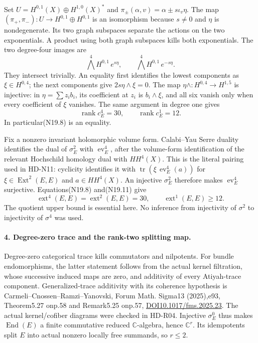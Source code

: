 Set $U=H^{0,1}(X)\oplus H^{1,0}(X)^*$ and
$\pi_\pm(\alpha,v)=\alpha\pm s\iota_v\eta$.
The map $(\pi_+,\pi_-):U\to H^{0,1}\oplus H^{0,1}$ is an
isomorphism because $s\ne0$ and $\eta$ is nondegenerate.
Its two graph subspaces separate the actions on the two
exponentials. A product using both graph subspaces kills both
exponentials. The two degree-four images are
\[
       \bigwedge^4H^{0,1}\,e^{s\eta},\qquad
       \bigwedge^4H^{0,1}\,e^{-s\eta}.                          \tag{N19.10}
\]
They intersect trivially. An equality first identifies the lowest
components as $\xi\in H^{0,4}$; the next components give
$2s\eta\wedge\xi=0$. The map
$\eta\wedge:H^{0,4}\to H^{1,5}$ is injective: in
$\eta=\sum z_i b_i$, its coefficient at $z_i$ is $b_i\wedge\xi$,
and all six vanish only when every coefficient of $\xi$ vanishes.
The same argument in degree one gives
\[
                 \operatorname{rank}c_E^4=30,\qquad
                 \operatorname{rank}c_E^1=12.                 \tag{N19.11}
\]
In particular(N19.8) is an equality.

Fix a nonzero invariant holomorphic volume form. Calabi--Yau Serre
duality identifies the dual of $\sigma_E^2$ with
$\operatorname{ev}_E^4$, after the volume-form identification of the
relevant Hochschild homology dual with $HH^4(X)$. This is the
literal pairing used in HD-N11: cyclicity identifies it with
$\operatorname{tr}(\xi\,\operatorname{ev}_E^4(a))$ for
$\xi\in\operatorname{Ext}^2(E,E)$ and $a\in HH^4(X)$.
An injective $\sigma_E^2$ therefore makes
$\operatorname{ev}_E^4$ surjective. Equations(N19.8) and(N19.11) give
\[
 \operatorname{ext}^4(E,E)=\operatorname{ext}^2(E,E)=30,\qquad
                        \operatorname{ext}^1(E,E)\ge12.        \tag{N19.12}
\]
The quotient upper bound is essential here. No inference from
injectivity of $\sigma^2$ to injectivity of $\sigma^4$ was used.

\paragraph{4. Degree-zero trace and the rank-two splitting map.}
Degree-zero categorical trace kills commutators and nilpotents.
For bundle endomorphisms, the latter statement follows from the
actual kernel filtration, whose successive induced maps are zero,
and additivity of every Atiyah-trace component. Generalized-trace
additivity with its coherence hypothesis is
Carmeli--Cnossen--Ramzi--Yanovski, Forum Math. Sigma13 (2025),e93,
Theorem5.27 onp.58 and Remark5.25 onp.57,
\href{https://doi.org/10.1017/fms.2025.23}{DOI10.1017/fms.2025.23}.
The actual kernel/cofiber diagrams were checked in HD-R04.
Injective $\sigma_E^0$ thus makes $\operatorname{End}(E)$ a finite
commutative reduced $\mathbb C$-algebra, hence $\mathbb C^r$.
Its idempotents split $E$ into actual nonzero locally free summands,
so $r\le2$.

